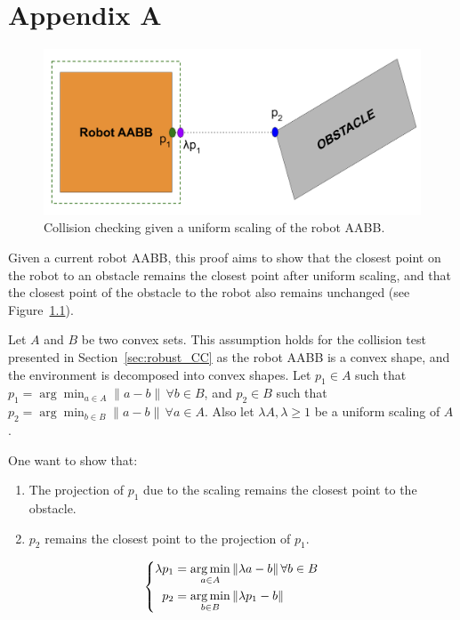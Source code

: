 \chapter{Appendix A}\label{chap:appendixA}

\begin{figure} [t]
    \centering
    \includegraphics[width=0.8\linewidth]{figures/appendix/CCellipse.png}
    \caption{Collision checking given a uniform scaling of the robot AABB.}
    \label{fig:appendix_A}
\end{figure}

Given a current robot AABB, this proof aims to show that the closest point on the robot to an obstacle remains the closest point after uniform scaling, and that the closest point of the obstacle to the robot also remains unchanged (see Figure~\ref{fig:appendix_A}).

Let $A$ and $B$ be two convex sets. 
This assumption holds for the collision test presented in Section~\ref{sec:robust_CC} as the robot AABB is a convex shape, and the environment is decomposed into convex shapes.
Let \( p_1 \in A \) such that \( p_1 = \arg \min_{a \in A} \|a - b\| \, \forall b \in B \), and \( p_2 \in B \) such that \( p_2 = \arg \min_{b \in B} \|a - b\| \, \forall a \in A \).
Also let $\lambda A, \lambda \geq 1$ be a uniform scaling of $A$.

One want to show that:
\begin{enumerate}
    \item The projection of $p_1$ due to the scaling remains the closest point to the obstacle.
    \item $p_2$ remains the closest point to the projection of $p_1$. 
\end{enumerate}
\[
    \left\{
    \begin{aligned}
        \lambda p_1 &= \operatorname*{arg\,min}_{a \in A} \|\lambda a - b\| \, \forall b \in B \\
        p_2 &= \operatorname*{arg\,min}_{b \in B} \|\lambda p_1 - b\|
    \end{aligned}
    \right.
\]

